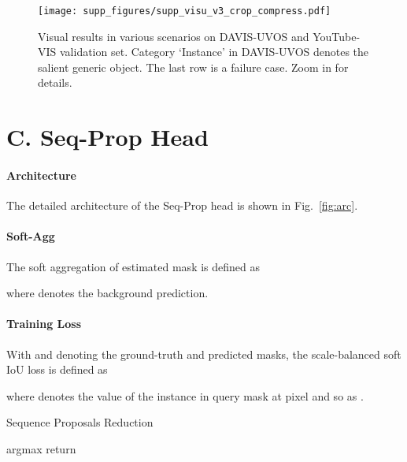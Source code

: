 \documentclass[10pt,twocolumn,letterpaper]{article}
\begin{document}
	\begin{figure*}[t!]
		\begin{center}
			\texttt{[image: supp\_figures/supp\_visu\_v3\_crop\_compress.pdf]}
		\end{center}
		\caption{Visual results in various scenarios on DAVIS-UVOS and YouTube-VIS validation set. Category `Instance' in DAVIS-UVOS denotes the salient generic object. The last row is a failure case.
		Zoom in for details.}
		\label{fig:visu}
		\vspace{0.1in}
	\end{figure*}
	
	\section*{C. Seq-Prop Head} \label{sec:head}
	\vspace{-0.05in}
	\paragraph{Architecture} 
    The detailed architecture of the Seq-Prop head is shown in Fig.~\ref{fig:arc}.
	\vspace{-0.2in}		
	\paragraph{Soft-Agg}
	The soft aggregation \cite{wug2018fast} of estimated mask  is defined as 
	
	where  denotes the background prediction.
\vspace{-0.05in}
	\paragraph{Training Loss}
	With  and  denoting the ground-truth and predicted masks, the scale-balanced soft IoU loss \cite{lin2019agss} is defined as 
	
	
	where  denotes the value of the  instance in query mask  at pixel  and so as .
	

	
	\begin{algorithm}[t]\label{alg:iou} 
		\caption{Sequence Proposals Reduction} 
		
		\;
		\While{}
		{
			 argmax \;
			 \;
			\;
			{
				{
					\;
					\;
					\;
				}
			}
		}
		return \;	
	\end{algorithm}
	
\end{document}
